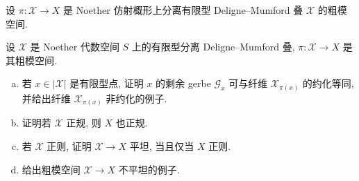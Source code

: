 \begin{exercise}\label{src:5.4.18}
设 $\pi:\mathcal X\to X$ 是 Noether 仿射概形上分离有限型 Deligne--Mumford 叠 $\mathcal X$ 的粗模空间.
\end{exercise}
\begin{exercise}\label{src:5.4.19}
设 $\mathcal X$ 是 Noether 代数空间 $S$ 上的有限型分离 Deligne--Mumford 叠, $\pi:\mathcal X\to X$ 是其粗模空间.
\begin{enumerate}[(a)]
\item 若 $x\in|\mathcal X|$ 是有限型点, 证明 $x$ 的剩余 gerbe $\mathcal G_x$ 可与纤维 $\mathcal X_{\pi(x)}$ 的约化等同, 并给出纤维 $\mathcal X_{\pi(x)}$ 非约化的例子.
\item 证明若 $\mathcal X$ 正规, 则 $X$ 也正规.
\item 若 $\mathcal X$ 正则, 证明 $\mathcal X\to X$ 平坦, 当且仅当 $X$ 正则.
\item 给出粗模空间 $\mathcal X\to X$ 不平坦的例子.
\end{enumerate}
\end{exercise}

